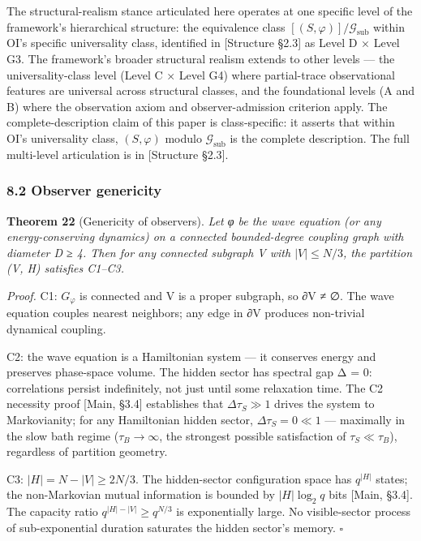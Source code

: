 \documentclass[
]{article}
\begin{document}
The structural-realism stance articulated here operates at one specific
level of the framework's hierarchical structure: the equivalence class
\([(S, \varphi)]/\mathcal{G}_{\text{sub}}\) within OI's specific
universality class, identified in {[}Structure §2.3{]} as Level D ×
Level G3. The framework's broader structural realism extends to other
levels --- the universality-class level (Level C × Level G4) where
partial-trace observational features are universal across structural
classes, and the foundational levels (A and B) where the observation
axiom and observer-admission criterion apply. The complete-description
claim of this paper is class-specific: it asserts that within OI's
universality class, \((S, \varphi)\) modulo \(\mathcal{G}_{\text{sub}}\)
is the complete description. The full multi-level articulation is in
{[}Structure §2.3{]}.

\hypertarget{observer-genericity}{%
\subsubsection{8.2 Observer genericity}\label{observer-genericity}}

\textbf{Theorem 22} (Genericity of observers). \emph{Let φ be the wave
equation (or any energy-conserving dynamics) on a connected
bounded-degree coupling graph with diameter D ≥ 4. Then for any
connected subgraph V with \(|V| \leq N/3\), the partition (V, H)
satisfies C1--C3.}

\emph{Proof.} C1: \(G_\varphi\) is connected and V is a proper subgraph,
so ∂V ≠ ∅. The wave equation couples nearest neighbors; any edge in ∂V
produces non-trivial dynamical coupling.

C2: the wave equation is a Hamiltonian system --- it conserves energy
and preserves phase-space volume. The hidden sector has spectral gap Δ =
0: correlations persist indefinitely, not just until some relaxation
time. The C2 necessity proof {[}Main, §3.4{]} establishes that
\(\Delta \tau_S \gg 1\) drives the system to Markovianity; for any
Hamiltonian hidden sector, \(\Delta \tau_S = 0 \ll 1\) --- maximally in
the slow bath regime (\(\tau_B \to \infty\), the strongest possible
satisfaction of \(\tau_S \ll \tau_B\)), regardless of partition
geometry.

C3: \(|H| = N - |V| \geq 2N/3\). The hidden-sector configuration space
has \(q^{|H|}\) states; the non-Markovian mutual information is bounded
by \(|H| \log_2 q\) bits {[}Main, §3.4{]}. The capacity ratio
\(q^{|H| - |V|} \geq q^{N/3}\) is exponentially large. No visible-sector
process of sub-exponential duration saturates the hidden sector's
memory. \(\square\)
\end{document}
